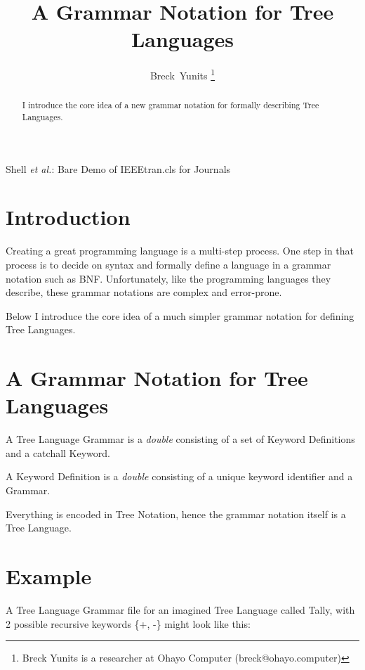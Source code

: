 \documentclass[journal]{IEEEtran}
\begin{document}
\title{A Grammar Notation for Tree Languages}

\author{Breck~Yunits%
\thanks{Breck Yunits is a researcher at Ohayo Computer (breck@ohayo.computer)}%
}

%
{Shell \MakeLowercase{\textit{et al.}}: Bare Demo of IEEEtran.cls for Journals}

\maketitle


\begin{abstract}
I introduce the core idea of a new grammar notation for formally describing Tree Languages.
\end{abstract}

\IEEEpeerreviewmaketitle

\section{Introduction}

Creating a great programming language is a multi-step process. One step in that process is to decide on syntax and formally define a language in a grammar notation such as BNF. Unfortunately, like the programming languages they describe, these grammar notations are complex and error-prone.

Below I introduce the core idea of a much simpler grammar notation for defining Tree Languages.

\section{A Grammar Notation for Tree Languages}

A Tree Language Grammar is a \textit{double} consisting of a set of Keyword Definitions and a catchall Keyword.

A Keyword Definition is a \textit{double} consisting of a unique keyword identifier and a Grammar.

Everything is encoded in Tree Notation, hence the grammar notation itself is a Tree Language.

\section{Example}

A Tree Language Grammar file for an imagined Tree Language called Tally, with 2 possible recursive keywords \{+, -\} might look like this:
\end{document}
